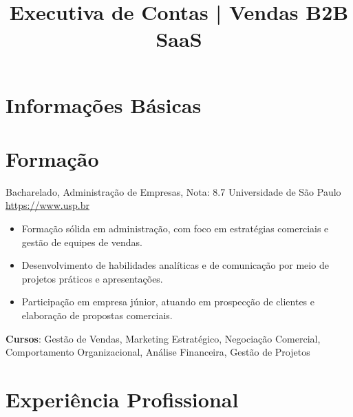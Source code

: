 \documentclass[a4paper, serif, 10pt]{moderncv}
\title{Executiva de Contas | Vendas B2B SaaS}
\begin{document}
\maketitle

\section{Informações Básicas}

\section{Formação}

        {Bacharelado, Administração de Empresas, Nota: 8.7}
        {Universidade de São Paulo}
        {\url{https://www.usp.br}}
        {}
        {\begin{itemize}
\item Formação sólida em administração, com foco em estratégias comerciais e gestão de equipes de vendas.
\item Desenvolvimento de habilidades analíticas e de comunicação por meio de projetos práticos e apresentações.
\item Participação em empresa júnior, atuando em prospecção de clientes e elaboração de propostas comerciais.
\end{itemize}
\textbf{Cursos}: Gestão de Vendas, Marketing Estratégico, Negociação Comercial, Comportamento Organizacional, Análise Financeira, Gestão de Projetos}
\section{Experiência Profissional}
\end{document}
